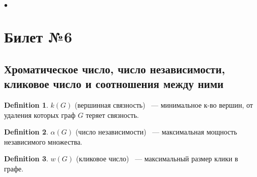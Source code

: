 \documentclass[a4paper]{article}
\theoremstyle{plain}
\theoremstyle{remark}
\theoremstyle{definition}
\newtheorem*{definition-star}{Definition}
\begin{document}
$\bullet$ \\ 

\section{Билет №6}
\subsection{Хроматическое число, число независимости, кликовое число и соотношения между ними}

\begin{definition-star} $k(G)$ (вершинная связность) ~--- минимальное к-во вершин, от удаления которых граф $G$ теряет связность.
\end{definition-star}
\begin{definition-star} $\alpha(G)$ (число независимости) ~--- максимальная мощность независимого множества.
\end{definition-star}
\begin{definition-star} $w(G)$ (кликовое число) ~--- максимальный размер клики в графе.
\end{definition-star}
\end{document}
